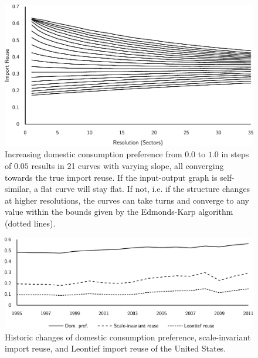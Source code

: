 \documentclass[english]{uzhpub}
\renewcommand{\baselinestretch}{1.5}
\begin{document}
\begin{figure}
\centering
\includegraphics[scale=0.8]{../results/globalpreferencevariation}
\caption{Increasing domestic consumption preference from $0.0$ to $1.0$ in steps of $0.05$ results in 21 curves with varying slope, all converging towards the true import reuse. If the input-output graph is self-similar, a flat curve will stay flat. If not, i.e. if the structure changes at higher resolutions, the curves can take turns and converge to any value within the bounds given by the Edmonds-Karp algorithm (dotted lines).} \label{fig:globalpref}
\end{figure}

\begin{figure}
\centering
\includegraphics[scale=0.6]{../results/domprefhistotyusa}
\caption{Historic changes of domestic consumption preference, scale-invariant import reuse, and Leontief import reuse of the United States.} \label{fig:domprefhistotyusa}
\end{figure}


\renewcommand{\baselinestretch}{1.0}
\end{document}
